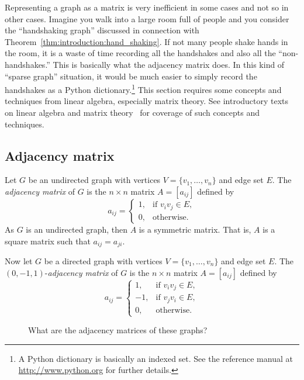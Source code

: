 Representing a graph as a matrix is very inefficient in some cases and
not so in other cases. Imagine you walk into a large room full of
people and you consider the ``handshaking graph'' discussed in
connection with Theorem~\ref{thm:introduction:hand_shaking}. If not
many people shake hands in the room, it is a waste of time recording
all the handshakes and also all the ``non-handshakes.'' This is
basically what the adjacency matrix does. In this kind of
``sparse graph'' situation, it would be much
easier to simply record the handshakes as a Python
dictionary.\footnote{
  A Python dictionary is basically an indexed set. See
  the reference manual at \url{http://www.python.org} for further
  details.
}
This section requires some concepts and techniques from linear
algebra, especially matrix theory. See introductory texts on linear
algebra and matrix theory~\cite{Beezer2009} for coverage of such
concepts and techniques.



\subsection{Adjacency matrix}

Let $G$ be an undirected graph with vertices
$V = \{ v_1, \dots, v_n \}$ and edge set $E$. The
\emph{adjacency matrix} of $G$ is the $n \times n$ matrix
$A = [a_{ij}]$ defined by
\[
a_{ij}
=
\begin{cases}
1, & \text{if $v_i v_j \in E$}, \\
0, & \text{otherwise}.
\end{cases}
\]
As $G$ is an undirected graph, then $A$ is a symmetric matrix. That
is, $A$ is a square matrix such that $a_{ij} = a_{ji}$.

Now let $G$ be a directed graph with vertices
$V = \{ v_1, \dots, v_n \}$ and edge set $E$. The
$(0, -1, 1)$-\emph{adjacency matrix} of $G$ is
the $n \times n$ matrix $A = [a_{ij}]$ defined by
\[
a_{ij}
=
\begin{cases}
1,  & \text{if $v_i v_j \in E$}, \\
-1, & \text{if $v_j v_i \in E$}, \\
0,  & \text{otherwise}.
\end{cases}
\]

\begin{figure}[!htbp]
\centering
{}

\caption{What are the adjacency matrices of these graphs?}
\label{fig:introduction:adjacency_matrices}
\end{figure}

